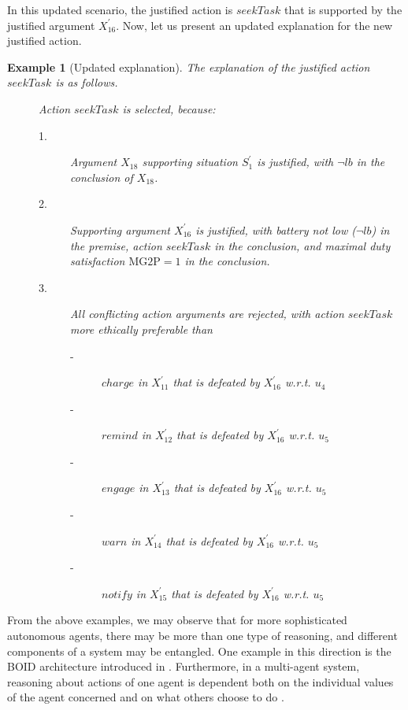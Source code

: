 \documentclass[letterpaper]{article} %
\newtheorem{example}{Example}
\begin{document}
In this updated scenario, the justified action is $seekTask$ that is supported by the justified argument $X^\prime_{16}$. Now, let us present an updated explanation for the new justified action. 

\begin{example}[Updated explanation]
The explanation of the justified action $seekTask$ is as follows. 
\begin{description}
\item[] Action $seekTask$ is selected, because:
\begin{description}
\item[1.] Argument $X_{18}$ supporting situation $S_1^\prime$ is justified, with $\neg lb$ in the conclusion of $X_{18}$.
\item[2.] Supporting argument $X_{16}^\prime$ is justified, with
 battery not low ($\neg lb$) in the premise,
 action $seekTask$ in the conclusion, and
 maximal duty satisfaction $\mathrm{MG2P} = 1$ in the conclusion.
\item[3.] All conflicting action arguments are rejected, with action $seekTask$ more ethically preferable than
\begin{description}
\item[-]  $charge$ in $X_{11}^\prime$ that is defeated by $X_{16}^\prime$ w.r.t. $u_4$ 
\item[-]  $remind$ in $X_{12}^\prime$ that is defeated by $X_{16}^\prime$ w.r.t. $u_5$ 
\item[-]  $engage$ in $X_{13}^\prime$ that is defeated by $X_{16}^\prime$ w.r.t. $u_5$ 
\item[-]  $warn$ in $X_{14}^\prime$ that is defeated by $X_{16}^\prime$ w.r.t. $u_5$ 
\item[-]  $notify$ in $X_{15}^\prime$ that is defeated by $X_{16}^\prime$ w.r.t. $u_5$ 
\end{description}
\end{description}
\end{description}
\end{example}

From the above examples, we may observe that for more sophisticated autonomous agents, there may be more than one type of reasoning, and different components of a system may be entangled. One example in this direction is the BOID architecture introduced in   \cite{DBLP:conf/agents/BroersenDHHT01}. Furthermore, in a multi-agent system, reasoning about actions of one agent is dependent both on the individual values of the agent concerned and on what others choose to do \cite{DBLP:journals/ai/AtkinsonB18}. 
\end{document}
